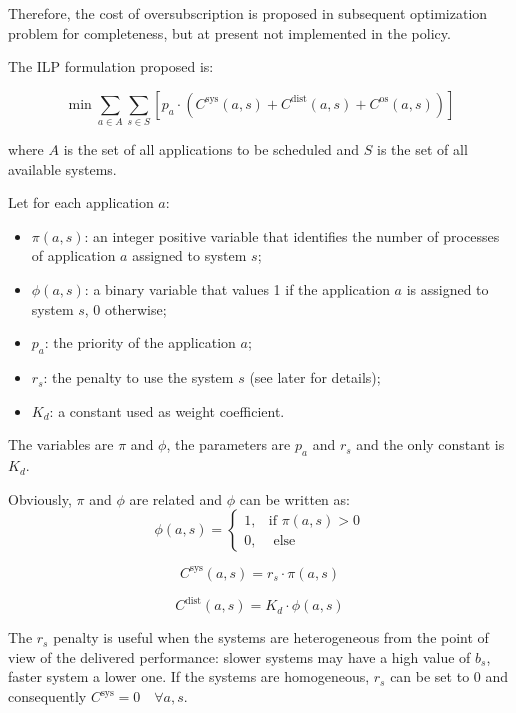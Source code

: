 Therefore, the cost of oversubscription is proposed in subsequent optimization
problem for completeness, but at present not implemented in the policy.

The ILP formulation proposed is:

\begin{equation}
\min \sum_{a\in A} \sum_{s \in S} \left[ {p_a \cdot ( C^{\text{sys}}(a,s) + C^{\text{dist}}(a,s) +
C^{\text{os}}(a,s) )} \right]
\label{eq:policy_optimization}
\end{equation}

where \(A\) is the set of all applications to be scheduled and \(S\) is the set of all available systems.

Let for each application \(a\):
\begin{itemize}
\item \(\pi(a,s)\):  an integer positive variable that identifies the number of
processes of application \(a\) assigned to system \( s \);
\item \(\phi(a,s)\): a binary variable that values 1 if the application \(a\)
                     is assigned to system \(s\), 0 otherwise;
\item \(p_a\): the priority of the application \(a \);
\item \(r_s\): the penalty to use the system \(s\) (see later for details); 
\item \(K_d\): a constant used as weight coefficient.
\end{itemize}


The variables are \(\pi\) and \(\phi\), the parameters are \(p_a\) and \(r_s\)
and the only constant is \(K_d\).

Obviously, \(\pi\) and \(\phi\) are related and \( \phi \) can be written as:
\[
    \phi(a,s) =  
\begin{cases} 
  1, & \mbox{if } \pi(a,s) > 0 \\ 
  0, & \mbox{ else}
\end{cases}
\]

\begin{equation}
C^{\text{sys}}(a,s) =  r_s \cdot \pi(a,s)
\label{eq:policy_penalty_system}
\end{equation}

\begin{equation}
C^{\text{dist}}(a,s) = K_d \cdot \phi(a,s)
\label{eq:policy_penalty_dist}
\end{equation}

The \(r_s\) penalty is useful when the systems are heterogeneous from the
point of view of the delivered performance: slower systems
may have a high value of \(b_s\), faster system a lower one. If the systems are
homogeneous, \(r_s\) can be set to \(0\) and consequently
\(C^{\text{sys}} = 0\quad \forall a,s\).


